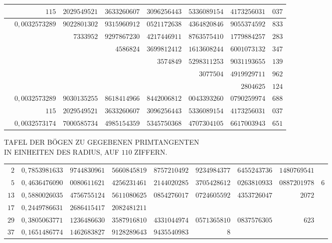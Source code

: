 \begin{longtable}{@{}rrrrrrrr@{}}
\hline
 & $115$ & $2029549521$ & $3633260607$ & $3096256443$ & $5336089154$ & $4173256031$ & $037$\\
\hline
 & $0{,}0032573289$ & $9022801302$ & $9315960912$ & $0521172638$ & $4364820846$ & $9055374592$ & $833$\\
 &  & $7333952$ & $9297867230$ & $4217446911$ & $8763575410$ & $1779884257$ & $283$\\
 &  &  & $4586824$ & $3699812412$ & $1613608244$ & $6001073132$ & $347$\\
 &  &  &  & $3574849$ & $5298311253$ & $9031193655$ & $139$\\
 &  &  &  &  & $3077504$ & $4919929711$ & $962$\\
 &  &  &  &  &  & $2804625$ & $124$\\
\hline
 & $0{,}0032573289$ & $9030135255$ & $8618414966$ & $8442006812$ & $0043393260$ & $0790259974$ & $688$\\
 & $115$ & $2029549521$ & $3633260607$ & $3096256443$ & $5336089154$ & $4173256031$ & $037$\\
\hline
 & $0{,}0032573174$ & $7000585734$ & $4985154359$ & $5345750368$ & $4707304105$ & $6617003943$ & $651$\\
\end{longtable}\endgroup
\par{}
\begin{center}\small TAFEL DER BÖGEN ZU GEGEBENEN PRIMTANGENTEN\\
IN EINHEITEN DES RADIUS, AUF $110$ ZIFFERN.\end{center}
\begingroup\fontsize{8.5}{11}\selectfont\setlength{\tabcolsep}{1.5pt}
\begin{longtable}{@{}r|rrrrrrrr@{}}
\hline
$2$ & $0{,}7853981633$ & $9744830961$ & $5660845819$ & $8757210492$ & $9234984377$ & $6455243736$ & $1480769541$ & \\
$5$ & $0{,}4636476090$ & $0080611621$ & $4256231461$ & $2144020285$ & $3705428612$ & $0263810933$ & $0887201978$ & $6$\\
$13$ & $0{,}5880026035$ & $4756755124$ & $5611080625$ & $0854276017$ & $0724605592$ & $4353726047$ & $2072$ & \\
$17$ & $0{,}2449786631$ & $2686415417$ & $2082481211$ &  &  &  &  & \\
$29$ & $0{,}3805063771$ & $1236486630$ & $3587916810$ & $4331044974$ & $0571365810$ & $0837576305$ & $623$ & \\
$37$ & $0{,}1651486774$ & $1462683827$ & $9128289643$ & $9435540983$ & $8$ &  &  & \\
\end{longtable}\endgroup
